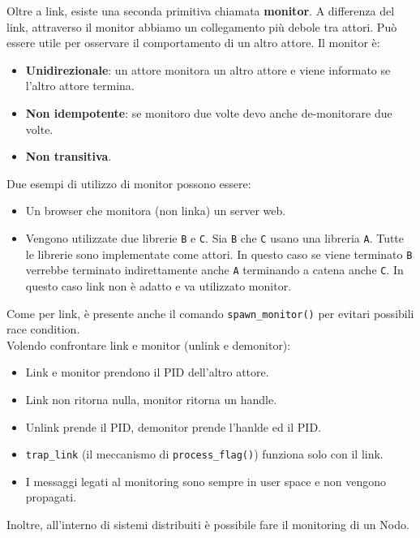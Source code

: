 \documentclass{article}
\begin{document}
\pagebreak

Oltre a link, esiste una seconda primitiva chiamata \textbf{monitor}. A differenza del link, attraverso il monitor abbiamo un collegamento più debole tra attori. Può essere utile per osservare il comportamento di un altro attore. Il monitor è:
\begin{itemize}
    \item \textbf{Unidirezionale}: un attore monitora un altro attore e viene informato se l'altro attore termina.
    \item \textbf{Non idempotente}: se monitoro due volte devo anche de-monitorare due volte.
    \item \textbf{Non transitiva}.
\end{itemize}

Due esempi di utilizzo di monitor possono essere:
\begin{itemize}
    \item Un browser che monitora (non linka) un server web.
    \item Vengono utilizzate due librerie \texttt{B} e \texttt{C}. Sia \texttt{B} che \texttt{C} usano una libreria \texttt{A}. Tutte le librerie sono implementate come attori. In questo caso se viene terminato \texttt{B} verrebbe terminato indirettamente anche \texttt{A} terminando a catena anche \texttt{C}. In questo caso link non è adatto e va utilizzato monitor.
\end{itemize}
Come per link, è presente anche il comando \texttt{spawn\_monitor()} per evitari possibili race condition.
\vspace{14pt}\\
Volendo confrontare link e monitor (unlink e demonitor):
\begin{itemize}
    \item Link e monitor prendono il PID dell'altro attore.
    \item Link non ritorna nulla, monitor ritorna un handle.
    \item Unlink prende il PID, demonitor prende l'hanlde ed il PID.
    \item \texttt{trap\_link} (il meccanismo di \texttt{process\_flag()}) funziona solo con il link.
    \item I messaggi legati al monitoring sono sempre in user space e non vengono propagati.\\
\end{itemize}
Inoltre, all'interno di sistemi distribuiti è possibile fare il monitoring di un Nodo.
\end{document}
